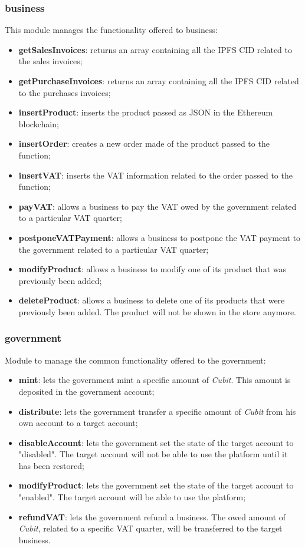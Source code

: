 \subsubsection{business}
This module manages the functionality offered to business:
\begin{itemize}
	\item \textbf{getSalesInvoices}: returns an array containing all the IPFS CID related to the sales invoices;
	\item \textbf{getPurchaseInvoices}: returns an array containing all the IPFS CID related to the purchases invoices;
	
	\item \textbf{insertProduct}: inserts the product passed as JSON in the Ethereum blockchain; 
	\item \textbf{insertOrder}: creates a new order made of the product passed to the function;
	\item \textbf{insertVAT}: inserts the VAT information related to the order passed to the function;
	\item \textbf{payVAT}: allows a business to pay the VAT owed by the government related to a particular VAT quarter;
	\item \textbf{postponeVATPayment}: allows a business to postpone the VAT payment to the government related to a particular VAT quarter;
	\item \textbf{modifyProduct}: allows a business to modify one of its product that was previously been added;
	\item \textbf{deleteProduct}: allows a business to delete one of its products that were previously been added. The product will not be shown in the store anymore.
\end{itemize}
\subsubsection{government}
Module to manage the common functionality offered to the government:
\begin{itemize}
	\item \textbf{mint}: lets the government mint a specific amount of \textit{Cubit}. This amount is deposited in the government account;
	\item \textbf{distribute}: lets the government transfer a specific amount of \textit{Cubit} from his own account to a target account;
	\item \textbf{disableAccount}: lets the government set the state of the target account to "disabled". The target account will not be able to use the platform until it has been restored;
	\item \textbf{modifyProduct}: lets the government set the state of the target account to "enabled". The target account will be able to use the platform;
	\item \textbf{refundVAT}: lets the government refund a business. The owed amount of \textit{Cubit}, related to a specific VAT quarter, will be transferred to the target business.
\end{itemize}
